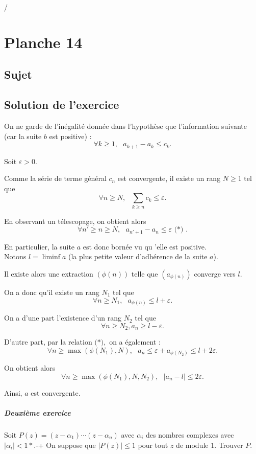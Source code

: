 /\chapter{Planche 14}

\section{Sujet}


\section{Solution de l'exercice}

On ne garde de l'inégalité donnée dans l'hypothèse que l'information suivante (car la suite $b$ est positive) : 
$$\forall k\geq 1,\mbox{ } a_{k+1}-a_{k}\leq c_{k}.$$

Soit $\varepsilon>0.$

Comme la série de terme général $c_{n}$ est convergente, il existe un rang $N\geq 1$ tel que $$\forall n\geq N,\mbox{ } \sum_{k\geq n}c_{k}\leq \varepsilon.$$

En observant un télescopage, on obtient alors
$$\forall n'\geq n\geq N, \mbox{ } a_{n'+1}-a_{n}\leq \varepsilon \mbox{ (*) }.$$

En particulier, la suite $a$ est donc bornée vu qu 'elle est positive.\\

Notons $l=\liminf a$ (la plus petite valeur d'adhérence de la suite $a$).

Il existe alors une extraction $(\phi(n))$ telle que $(a_{\phi(n)})$ converge vers $l.$

On a donc qu'il existe un rang $N_{1}$ tel que $$\forall n\geq N_{1},\mbox{ } a_{\phi(n)}\leq l+\varepsilon.$$

On a d'une part l'existence d'un rang $N_{2}$ tel que $$\forall n\geq N_{2}, a_{n}\geq l-\varepsilon.$$

D'autre part, par la relation $\mbox{(*)},$ on a également : $$\forall n\geq \max{(\phi(N_{1}),N)},\mbox{ } a_{n}\leq \varepsilon + a_{\phi(N_{2})}\leq l+2\varepsilon.$$

On obtient alors $$\forall n\geq \max{(\phi(N_{1}),N,N_{2})},\mbox{ } \vert a_{n}-l\vert \leq 2\varepsilon.$$

Ainsi, $a$ est convergente.

\paragraph{Deuxième exercice}
Soit $P(z) = (z-\alpha_1)\cdots(z-\alpha_n)$ avec $\alpha_i$ des nombres complexes avec $|\alpha_i| < 1*$.-+
On suppose que $|P(z)| \leqslant 1$ pour tout $z$ de module $1$.
Trouver $P$.

